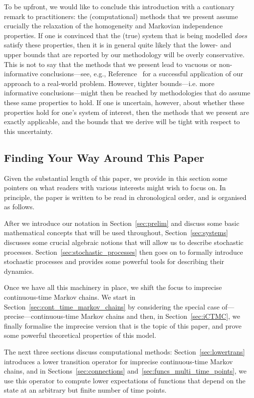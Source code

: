\documentclass[10pt,a4paper]{paper}
\theoremstyle{definition}
\begin{document}
To be upfront, we would like to conclude this introduction with a cautionary remark to practitioners: the (computational) methods that we present assume crucially the relaxation of the homogeneity and Markovian independence properties. If one is convinced that the (true) system that is being modelled \emph{does} satisfy these properties, then it is in general quite likely that the lower- and upper bounds that are reported by our methodology will be overly conservative. This is not to say that the methods that we present lead to vacuous or non-informative conclusions---see, e.g., Reference~\cite{Rottondi2017DRCN} for a successful application of our approach to a real-world problem. However, tighter bounds---i.e. more informative conclusions---might then be reached by methodologies that do assume these same properties to hold. If one is uncertain, however, about whether these properties hold for one's system of interest, then the methods that we present are exactly applicable, and the bounds that we derive will be tight with respect to this uncertainty.

\subsection{Finding Your Way Around This Paper}

Given the substantial length of this paper, we provide in this section some pointers on what readers with various interests might wish to focus on. In principle, the paper is written to be read in chronological order, and is organised as follows.

After we  introduce our notation in Section~\ref{sec:prelim} and discuss some basic mathematical concepts that will be used throughout, Section~\ref{sec:systems} discusses some crucial algebraic notions that will allow us to describe stochastic processes. Section~\ref{sec:stochastic_processes} then goes on to formally introduce stochastic processes and provides some powerful tools for describing their dynamics.


Once we have all this machinery in place, we shift the focus to imprecise continuous-time Markov chains. We start in Section~\ref{sec:cont_time_markov_chains} by considering the special case of---precise---continuous-time Markov chains and then, in Section~\ref{sec:iCTMC}, we finally formalise the imprecise version that is the topic of this paper, and prove some powerful theoretical properties of this model.


The next three sections discuss computational methods: Section~\ref{sec:lowertrans} introduces a lower transition operator for imprecise continuous-time Markov chains, and in Sections~\ref{sec:connections} and~\ref{sec:funcs_multi_time_points}, we use this operator to compute lower expectations of functions that depend on the state at an arbitrary but finite number of time points. 
\end{document}
